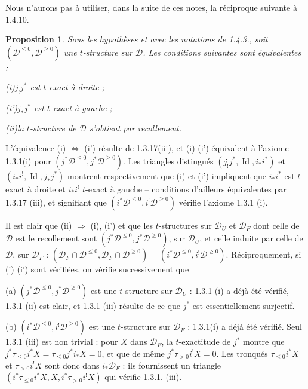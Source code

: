 \documentclass[12pt,a4paper]{article}
\theoremstyle{plain}
\newtheorem{proposition}[theorem]{Proposition}
\theoremstyle{definition}
\DeclareMathOperator{\Id}{Id}
\begin{document}
Nous n'aurons pas \`a utiliser, dans la suite de ces notes, la r\'eciproque suivante \`a 1.4.10.

\begin{proposition}\label{prop:1.4.12}
Sous les hypoth\`eses et avec les notations de \emph{1.4.3.}, soit $(\mathcal{D}^{\leqslant 0}, \mathcal{D}^{\geqslant 0})$ une $t$-structure sur $\mathcal{D}$. Les conditions suivantes sont \'equivalentes :

\emph{(i)}\quad $j_!j^*$ est $t$-exact \`a droite ;

\emph{(i')}\quad $j_*j^*$ est $t$-exact \`a gauche ;

\emph{(ii)}\quad la $t$-structure de $\mathcal{D}$ s'obtient par recollement.
\end{proposition}

L'\'equivalence (i) $\Leftrightarrow$ (i') r\'esulte de 1.3.17(iii), et (i) (i') \'equivalent \`a l'axiome 1.3.1(i) pour $(j^*\mathcal{D}^{\leqslant 0}, j^*\mathcal{D}^{\geqslant 0})$. Les triangles distingu\'es $(j_!j^*, \Id, i_*i^*)$ et $(i_*i^!, \Id, j_*j^*)$ montrent respectivement que (i) et (i') impliquent que $i_*i^*$ est $t$-exact \`a droite et $i_*i^!$ $t$-exact \`a gauche -- conditions d'ailleurs \'equivalentes par 1.3.17 (iii), et signifiant que $(i^*\mathcal{D}^{\leqslant 0}, i^!\mathcal{D}^{\geqslant 0})$ v\'erifie l'axiome 1.3.1 (i).

Il est clair que (ii) $\Rightarrow$ (i), (i') et que les $t$-structures sur $\mathcal{D}_U$ et $\mathcal{D}_F$ dont celle de $\mathcal{D}$ est le recollement sont $(j^*\mathcal{D}^{\leqslant 0}, j^*\mathcal{D}^{\geqslant 0})$, sur $\mathcal{D}_U$, et celle induite par celle de $\mathcal{D}$, sur $\mathcal{D}_F$ : $(\mathcal{D}_F \cap \mathcal{D}^{\leqslant 0}, \mathcal{D}_F \cap \mathcal{D}^{\geqslant 0}) = (i^*\mathcal{D}^{\leqslant 0}, i^!\mathcal{D}^{\geqslant 0})$. R\'eciproquement, si (i) (i') sont v\'erifi\'ees, on v\'erifie successivement que

(a) $(j^*\mathcal{D}^{\leqslant 0}, j^*\mathcal{D}^{\geqslant 0})$ est une $t$-structure sur $\mathcal{D}_U$ : 1.3.1 (i) a d\'ej\`a \'et\'e v\'erifi\'e, 1.3.1 (ii) est clair, et 1.3.1 (iii) r\'esulte de ce que $j^*$ est essentiellement surjectif.

(b) $(i^*\mathcal{D}^{\leqslant 0}, i^!\mathcal{D}^{\geqslant 0})$ est une $t$-structure sur $\mathcal{D}_F$ : 1.3.1(i) a d\'ej\`a \'et\'e v\'erifi\'e. Seul 1.3.1 (iii) est non trivial : pour $X$ dans $\mathcal{D}_F$, la $t$-exactitude de $j^*$ montre que $j^*\tau_{\leqslant 0}i^*X = \tau_{\leqslant 0}j^*i_*X = 0$, et que de m\^eme $j^*\tau_{>0}i^!X = 0$. Les tronqu\'es $\tau_{\leqslant 0}i^*X$ et $\tau_{>0}i^!X$ sont donc dans $i_*\mathcal{D}_F$ : ils fournissent un triangle $(i^*\tau_{\leqslant 0}i^*X, X, i^*\tau_{>0}i^!X)$ qui v\'erifie 1.3.1. (iii).
\end{document}
